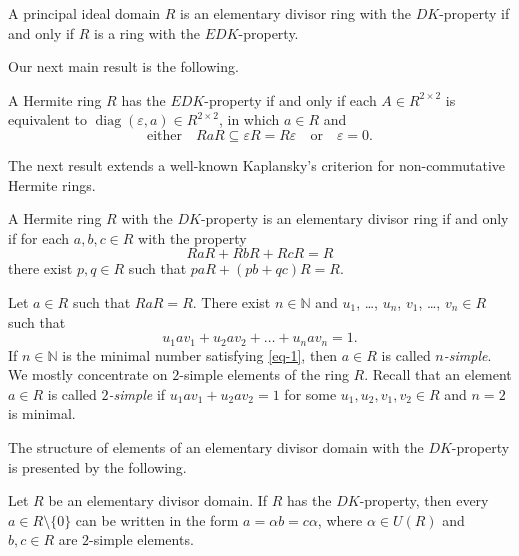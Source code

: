 \documentclass{cimart}
\DeclareMathOperator\diag{diag}
\begin{document}
\smallskip

\begin{theorem}\label{ThR:3}
A principal ideal domain  $R$ is an elementary divisor ring with the $DK$-property if and only if  $R$ is a  ring with the $EDK$-property.
\end{theorem}


Our next main result is the following.

\begin{theorem}\label{ThR:4}
A Hermite ring $R$ has the $EDK$-property if and only if  each $A\in R^{2\times 2}$ is equivalent to $\diag(\varepsilon,a)\in R^{2\times 2}$, in which $a\in R$ and
\[
\text{either}\quad   RaR\subseteq\varepsilon R=R\varepsilon \quad \text{or}\quad \varepsilon=0.
\]
\end{theorem}


The next  result extends a well-known  Kaplansky's  criterion \cite[Theorem 5.2,  p.\, 472]{7-kaplansky} for non-commutative Hermite rings.
\begin{theorem}\label{New_Cor:5} %
A Hermite ring $R$ with the $DK$-property  is an elementary divisor ring if and only if for each  $a,b,c\in R$ with the property
\begin{equation}\label{EQQ:3}
RaR+RbR+RcR=R
\end{equation}
there exist $p,q\in R$ such that $paR+(pb+qc)R=R$.
\end{theorem}






Let $a\in R$ such that $RaR=R$. There  exist $n\in \mathbb{N}$ and $u_1$, \dots, $u_n$, $v_1$, \dots, $v_n\in R$ such that
    \begin{equation}\label{eq-1}
     u_1av_1+u_2av_2+\dots+u_nav_n=1.
    \end{equation}
If $n\in \mathbb{N}$ is the minimal number satisfying  \eqref{eq-1}, then $a\in R$ is called {\it $n$-simple}. We mostly  concentrate  on  $2$-simple elements of the ring $R$. Recall that an element $a\in R$ is called {\it $2$-simple} if $u_1av_1+u_2av_2=1$ for some $u_1,u_2,v_1,v_2\in R$ and $n=2$ is minimal.

The structure of  elements of an  elementary divisor domain  with the  $DK$-property is presented by the following.

\begin{theorem}\label{ThR:5}
Let $R$ be an elementary divisor domain. If   $R$ has the $DK$-property, then  every   $a\in R\setminus\{0\}$ can be  written in the form $a=\alpha b=c\alpha$, where $\alpha\in U(R)$  and $b, c\in R$ are  $2$-simple elements.
\end{theorem}
\end{document}
